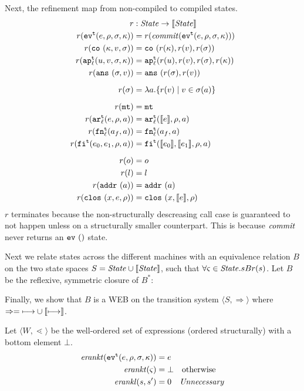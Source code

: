 \documentclass{llncs}
\begin{document}
Next, the refinement map from non-compiled to compiled states.
\begin{align*}
r &: \State \to \CompState \\
r(\ev[^\mcntr]{\mexp,\menv,\msto,\mkont}) &= r(\commit(\ev[^\mcntr]{\mexp,\menv,\msto,\mkont})) \\
r(\co{\mkont, \mval,\msto}) &= \co{r(\mkont), r(\mval), r(\msto)} \\
r(\ap[_\mlab^\mcntr]{\mvalx{u},\mval,\msto,\mkont}) &= \ap[_\mlab^\mcntr]{r(\mvalx{u}),r(\mval),r(\msto),r(\mkont)} \\
r(\ans{\msto,\mval}) &= \ans{r(\msto), r(\mval)} \\[2mm]
r(\msto) &= \lambda \maddr. \setof{r(\mval) \mid \mval \in \msto(\maddr)} \\[2mm]
r(\kmt) &= \kmt \\
r(\kar[^\mcntr_\mlab]{\mexp,\menv,\maddr}) &= \kar[^\mcntr_\mlab]{\compile{\mexp},\menv,\maddr} \\
r(\kfn[^\mcntr_\mlab]{\maddr_f,\maddr}) &= \kfn[^\mcntr_\mlab]{\maddr_f,\maddr} \\
r(\kif[^\mcntr]{\mexpi0,\mexpi1,\menv,\maddr}) &= \kif[^\mcntr]{\compile{\mexpi0},\compile{\mexpi1},\menv,\maddr} \\[2mm]
r(\mop) &= \mop \\
r(\mlit) &= \mlit \\
\spchoice
 {r(\saddr{\maddr}) &= \saddr{\maddr}}
 {r(\superposition{\mval{s}}) &= \superposition{\mval{s}}} \\
r(\clos{\mvar,\mexp,\menv}) &= \clos{\mvar,\compile{\mexp},\menv}
\end{align*}
$r$ terminates because the non-structurally descreasing call case is
guaranteed to not happen unless on a structurally smaller
counterpart. This is because $\commit$ never returns an $\ev{}$
state.

Next we relate states across the different machines with an
equivalence relation $B$ on the two state spaces $S = \State \cup \CompState$,
such that $\forall \mstate \in \State. s B r(s)$. Let $B$ be the reflexive, symmetric closure of $B^*$:
\begin{mathpar}
\end{mathpar}

Finally, we show that $B$ is a WEB on the transition system
$\langle S, \Rightarrow \rangle$ where $\Rightarrow = \machstep \cup \cmachstep$.

Let $\langle W, \lessdot \rangle$ be the well-ordered set of expressions (ordered structurally) with a bottom element $\bot$.
\begin{align*}
\erankt(\ev[^\mcntr]{\mexp,\menv,\msto,\mkont}) &= \mexp \\
\erankt(\mstate) &= \bot \quad \text{otherwise} \\
\erankl(s,s') &= 0 \quad \text{{\it Unnecessary}}
\end{align*}
\end{document}
